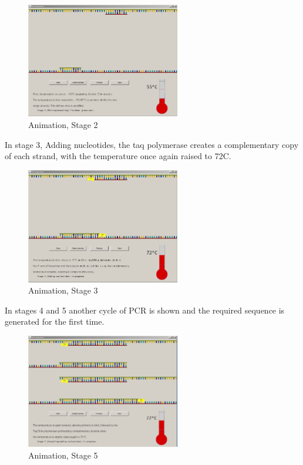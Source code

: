 \begin{figure}[h]
  \begin{center}
	\includegraphics[width=0.6\textwidth]{./images/AnimImpl/Stage2.png}
    \caption{
      \label{fig:AnimImpl:stage2}
      Animation, Stage 2
    }
  \end{center}
\end{figure}

In stage 3, Adding nucleotides, the taq polymerase creates a complementary copy of each strand, with the temperature once again raised to 72\degree C.

\begin{figure}[h]
  \begin{center}
	\includegraphics[width=0.6\textwidth]{./images/AnimImpl/Stage3.png}
    \caption{
      \label{fig:AnimImpl:stage3}
      Animation, Stage 3
    }
  \end{center}
\end{figure}

In stages 4 and 5 another cycle of PCR is shown and the required sequence is generated for the first time.

\begin{figure}[h]
  \begin{center}
	\includegraphics[width=0.6\textwidth]{./images/AnimImpl/Stage5.png}
    \caption{
      \label{fig:AnimImpl:stage5}
      Animation, Stage 5
    }
  \end{center}
\end{figure}


